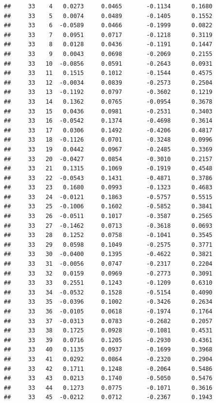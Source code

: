 \documentclass[
]{article}
\begin{document}
\begin{verbatim}
##     33    4   0.0273     0.0465       -0.1134      0.1680  
##     33    5   0.0074     0.0489       -0.1405      0.1552  
##     33    6  -0.0589     0.0466       -0.1999      0.0822  
##     33    7   0.0951     0.0717       -0.1218      0.3119  
##     33    8   0.0128     0.0436       -0.1191      0.1447  
##     33    9   0.0043     0.0698       -0.2069      0.2155  
##     33   10  -0.0856     0.0591       -0.2643      0.0931  
##     33   11   0.1515     0.1012       -0.1544      0.4575  
##     33   12  -0.0034     0.0839       -0.2573      0.2504  
##     33   13  -0.1192     0.0797       -0.3602      0.1219  
##     33   14   0.1362     0.0765       -0.0954      0.3678  
##     33   15   0.0436     0.0981       -0.2531      0.3403  
##     33   16  -0.0542     0.1374       -0.4698      0.3614  
##     33   17   0.0306     0.1492       -0.4206      0.4817  
##     33   18  -0.1126     0.0701       -0.3248      0.0996  
##     33   19   0.0442     0.0967       -0.2485      0.3369  
##     33   20  -0.0427     0.0854       -0.3010      0.2157  
##     33   21   0.1315     0.1069       -0.1919      0.4548  
##     33   22  -0.0543     0.1431       -0.4871      0.3786  
##     33   23   0.1680     0.0993       -0.1323      0.4683  
##     33   24  -0.0121     0.1863       -0.5757      0.5515  
##     33   25  -0.1006     0.1602       -0.5852      0.3841  
##     33   26  -0.0511     0.1017       -0.3587      0.2565  
##     33   27  -0.1462     0.0713       -0.3618      0.0693  
##     33   28   0.1252     0.0758       -0.1041      0.3545  
##     33   29   0.0598     0.1049       -0.2575      0.3771  
##     33   30  -0.0400     0.1395       -0.4622      0.3821  
##     33   31  -0.0056     0.0747       -0.2317      0.2204  
##     33   32   0.0159     0.0969       -0.2773      0.3091  
##     33   33   0.2551     0.1243       -0.1209      0.6310  
##     33   34  -0.0532     0.1528       -0.5154      0.4090  
##     33   35  -0.0396     0.1002       -0.3426      0.2634  
##     33   36  -0.0105     0.0618       -0.1974      0.1764  
##     33   37  -0.0313     0.0783       -0.2682      0.2057  
##     33   38   0.1725     0.0928       -0.1081      0.4531  
##     33   39   0.0716     0.1205       -0.2930      0.4361  
##     33   40   0.1135     0.0937       -0.1699      0.3968  
##     33   41   0.0292     0.0864       -0.2320      0.2904  
##     33   42   0.1711     0.1248       -0.2064      0.5486  
##     33   43   0.0213     0.1740       -0.5050      0.5476  
##     33   44   0.1273     0.0775       -0.1071      0.3616  
##     33   45  -0.0212     0.0712       -0.2367      0.1943  

\end{verbatim}
\end{document}
